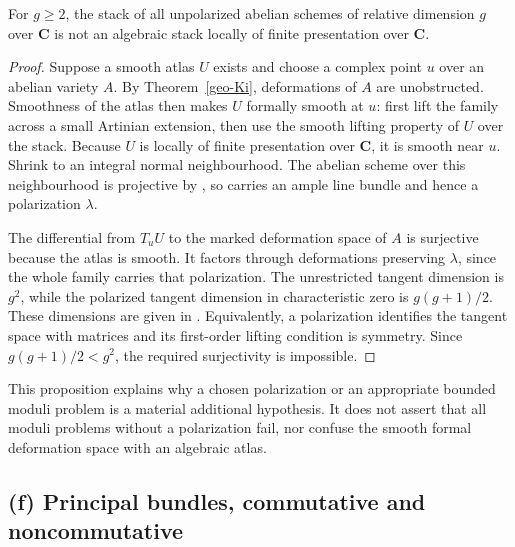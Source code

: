 \begin{proposition}
\label{geo-Ke-unpolarized}
For $g\geq2$, the stack of all unpolarized abelian schemes of relative
dimension $g$ over $\mathbf C$ is not an algebraic stack locally of finite
presentation over $\mathbf C$.
\end{proposition}
\begin{proof}
Suppose a smooth atlas $U$ exists and choose a complex point $u$ over an
abelian variety $A$. By Theorem~\ref{geo-Ki}, deformations of $A$ are
unobstructed. Smoothness of the atlas then makes $U$ formally smooth at
$u$: first lift the family across a small Artinian extension, then use the
smooth lifting property of $U$ over the stack. Because $U$ is locally of
finite presentation over $\mathbf C$, it is smooth near $u$. Shrink to an
integral normal neighbourhood. The abelian scheme over this neighbourhood
is projective by \cite[\S3(C), p.~258]{Murre1965}, so carries an ample
line bundle and hence a polarization $\lambda$.

The differential from $T_uU$ to the marked deformation space of $A$ is
surjective because the atlas is smooth. It factors through deformations
preserving $\lambda$, since the whole family carries that polarization.
The unrestricted tangent dimension is $g^2$, while the polarized tangent
dimension in characteristic zero is $g(g+1)/2$.
These dimensions are given in \cite[\S2.2, Theorem 2.2.1;
\S2.4, Theorem 2.4.1 and its proof]{Oort1971}.
Equivalently, a polarization identifies the tangent space with matrices
and its first-order lifting condition is symmetry. Since
$g(g+1)/2<g^2$, the required surjectivity is impossible.
\end{proof}

This proposition explains why a chosen polarization or an appropriate
bounded moduli problem is a material additional hypothesis. It does not
assert that all moduli problems without a polarization fail, nor confuse
the smooth formal deformation space with an algebraic atlas.

\subsection{(f) Principal bundles, commutative and noncommutative}

